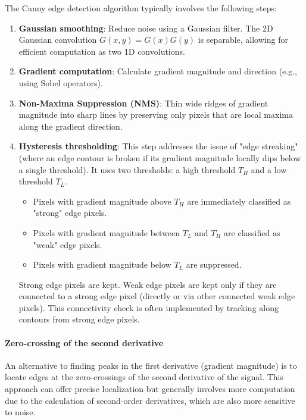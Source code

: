 The Canny edge detection algorithm typically involves the following steps:
\begin{enumerate}
  \item \textbf{Gaussian smoothing}: Reduce noise using a Gaussian filter. The 2D Gaussian convolution $G(x,y) = G(x)G(y)$ is separable, allowing for efficient computation as two 1D convolutions.
  \item \textbf{Gradient computation}: Calculate gradient magnitude and direction (e.g., using Sobel operators).
  \item \textbf{Non-Maxima Suppression (NMS)}: Thin wide ridges of gradient magnitude into sharp lines by preserving only pixels that are local maxima along the gradient direction.
  \item \textbf{Hysteresis thresholding}: This step addresses the issue of "edge streaking" (where an edge contour is broken if its gradient magnitude locally dips below a single threshold). It uses two thresholds: a high threshold $T_H$ and a low threshold $T_L$.
    \begin{itemize}
      \item Pixels with gradient magnitude above $T_H$ are immediately classified as "strong" edge pixels.
      \item Pixels with gradient magnitude between $T_L$ and $T_H$ are classified as "weak" edge pixels.
      \item Pixels with gradient magnitude below $T_L$ are suppressed.
    \end{itemize}
    Strong edge pixels are kept. Weak edge pixels are kept only if they are connected to a strong edge pixel (directly or via other connected weak edge pixels). This connectivity check is often implemented by tracking along contours from strong edge pixels.
\end{enumerate}

\paragraph{Zero-crossing of the second derivative}
An alternative to finding peaks in the first derivative (gradient magnitude) is to locate edges at the zero-crossings of the second derivative of the signal. This approach can offer precise localization but generally involves more computation due to the calculation of second-order derivatives, which are also more sensitive to noise.


